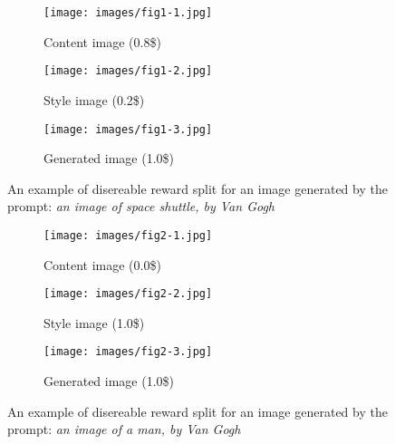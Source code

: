 \documentclass[12pt, letterpaper]{article}
\begin{document}
\begin{figure}[h!]
    \centering
    
    \begin{subfigure}{0.32\textwidth}
        \texttt{[image: images/fig1-1.jpg]}
        \caption{Content image (0.8\$)}
    \end{subfigure}
    \hfill
    \begin{subfigure}{0.32\textwidth}
        \texttt{[image: images/fig1-2.jpg]}
        \caption{Style image (0.2\$)}
    \end{subfigure}
    \hfill
    \begin{subfigure}{0.32\textwidth}
        \texttt{[image: images/fig1-3.jpg]}
        \caption{Generated image (1.0\$)}
    \end{subfigure}
    
    \centering
    \caption{An example of disereable reward split for an image generated by the prompt: \textit{an image of space shuttle, by Van Gogh}}
    \label{fig:figure_1}
\end{figure}

\begin{figure}[h!]
    \centering
    
    \begin{subfigure}{0.32\textwidth}
        \texttt{[image: images/fig2-1.jpg]}
        \caption{Content image (0.0\$)}
    \end{subfigure}
    \hfill
    \begin{subfigure}{0.32\textwidth}
        \texttt{[image: images/fig2-2.jpg]}
        \caption{Style image (1.0\$)}
    \end{subfigure}
    \hfill
    \begin{subfigure}{0.32\textwidth}
        \texttt{[image: images/fig2-3.jpg]}
        \caption{Generated image (1.0\$)}
    \end{subfigure}
    
    \centering
    \caption{An example of disereable reward split for an image generated by the prompt: \textit{an image of a man, by Van Gogh}}
    \label{fig:figure_2}
\end{figure}
\end{document}
